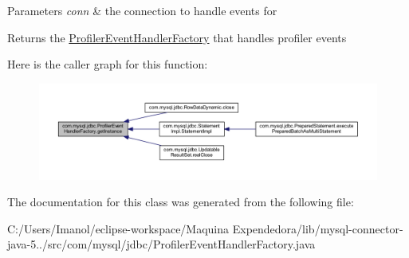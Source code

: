 \begin{DoxyParams}{Parameters}
{\em conn} & the connection to handle events for \\
\hline
\end{DoxyParams}
\begin{DoxyReturn}{Returns}
the \mbox{\hyperlink{classcom_1_1mysql_1_1jdbc_1_1_profiler_event_handler_factory}{Profiler\+Event\+Handler\+Factory}} that handles profiler events 
\end{DoxyReturn}
Here is the caller graph for this function\+:
\nopagebreak
\begin{figure}[H]
\begin{center}
\leavevmode
\includegraphics[width=350pt]{classcom_1_1mysql_1_1jdbc_1_1_profiler_event_handler_factory_a08c2982b1dba0c8012f879d1ea77ba69_icgraph}
\end{center}
\end{figure}


The documentation for this class was generated from the following file\+:\begin{DoxyCompactItemize}
\item 
C\+:/\+Users/\+Imanol/eclipse-\/workspace/\+Maquina Expendedora/lib/mysql-\/connector-\/java-\/5../src/com/mysql/jdbc/Profiler\+Event\+Handler\+Factory.\+java\end{DoxyCompactItemize}
